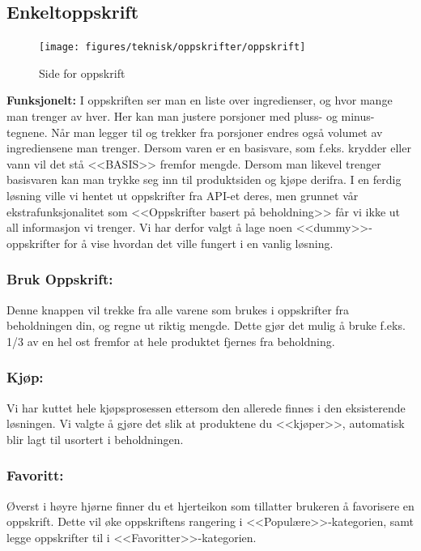 \subsection{\textbf{Enkeltoppskrift}}
\begin{figure}[H]
    \texttt{[image: figures/teknisk/oppskrifter/oppskrift]}
    \caption[Oppskrift]{Side for oppskrift
    \label{fig:oppskrift}}
\end{figure}

\textbf{Funksjonelt:}
I oppskriften ser man en liste over ingredienser, og hvor mange man trenger av hver. Her kan man justere porsjoner med pluss- og minus-tegnene. Når man legger til og trekker fra porsjoner endres også volumet av ingrediensene man trenger. Dersom varen er en basisvare, som f.eks. krydder eller vann vil det stå <<BASIS>> fremfor mengde. Dersom man likevel trenger basisvaren kan man trykke seg inn til produktsiden og kjøpe derifra. I en ferdig løsning ville vi hentet ut oppskrifter fra API-et deres, men grunnet vår ekstrafunksjonalitet som <<Oppskrifter basert på beholdning>> får vi ikke ut all informasjon vi trenger. Vi har derfor valgt å lage noen <<dummy>>-oppskrifter for å vise hvordan det ville fungert i en vanlig løsning.

\subsubsection{\textbf{Bruk Oppskrift:}}
Denne knappen vil trekke fra alle varene som brukes i oppskrifter fra beholdningen din, og regne ut riktig mengde. Dette gjør det mulig å bruke f.eks. 1/3 av en hel ost fremfor at hele produktet fjernes fra beholdning. 

\subsubsection{\textbf{Kjøp: }}
Vi har kuttet hele kjøpsprosessen ettersom den allerede finnes i den eksisterende løsningen. Vi valgte å gjøre det slik at produktene du <<kjøper>>, automatisk blir lagt til usortert i beholdningen.

\subsubsection{\textbf{Favoritt: }}
Øverst i høyre hjørne finner du et hjerteikon som tillatter brukeren å favorisere en oppskrift. Dette vil øke oppskriftens rangering i <<Populære>>-kategorien, samt legge oppskrifter til i <<Favoritter>>-kategorien.


